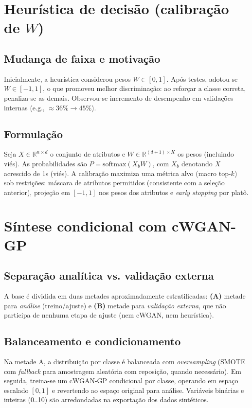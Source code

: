 \documentclass[12pt,a4paper]{article}
\begin{document}
\section{Heurística de decisão (calibração de $W$)}
\subsection{Mudança de faixa e motivação}
Inicialmente, a heurística considerou pesos $W\in[0,1]$. Após testes, adotou-se $W\in[-1,1]$, o que promoveu melhor discriminação: ao reforçar a classe correta, penaliza-se as demais. Observou-se incremento de desempenho em validações internas (e.g., $\approx36\%\rightarrow45\%$).

\subsection{Formulação}
Seja $X\in\mathbb{R}^{n\times d}$ o conjunto de atributos e $W\in\mathbb{R}^{(d+1)\times K}$ os pesos (incluindo viés). As probabilidades são $P=\mathrm{softmax}(X_b W)$, com $X_b$ denotando $X$ acrescido de 1s (viés). A calibração maximiza uma métrica alvo (macro top-$k$) sob restrições: máscara de atributos permitidos (consistente com a seleção anterior), projeção em $[-1,1]$ nos pesos dos atributos e \emph{early stopping} por platô.

\section{Síntese condicional com cWGAN-GP}
\subsection{Separação analítica vs. validação externa}
A base é dividida em duas metades aproximadamente estratificadas: \textbf{(A)} metade para \emph{análise} (treino/ajuste) e \textbf{(B)} metade para \emph{validação externa}, que não participa de nenhuma etapa de ajuste (nem cWGAN, nem heurística).

\subsection{Balanceamento e condicionamento}
Na metade A, a distribuição por classe é balanceada com \emph{oversampling} (SMOTE com \emph{fallback} para amostragem aleatória com reposição, quando necessário). Em seguida, treina-se um cWGAN-GP condicional por classe, operando em espaço escalado $[0,1]$ e revertendo ao espaço original para análise. Variáveis binárias e inteiras (0..10) são arredondadas na exportação dos dados sintéticos.
\end{document}
